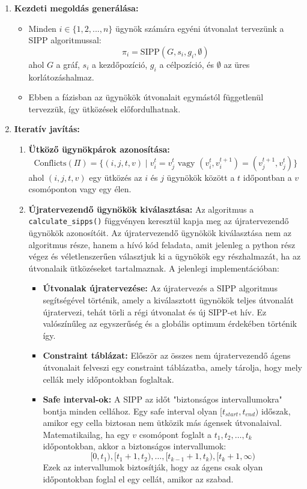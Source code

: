 \documentclass[a4paper,12pt]{article}
\begin{document}
\begin{enumerate}
    \item \textbf{Kezdeti megoldás generálása:}
    \begin{itemize}
        \item Minden $i \in \{1, 2, ..., n\}$ ügynök számára egyéni útvonalat tervezünk a SIPP algoritmussal:
        \[
        \pi_i = \text{SIPP}(G, s_i, g_i, \emptyset)
        \]
        ahol $G$ a gráf, $s_i$ a kezdőpozíció, $g_i$ a célpozíció, és $\emptyset$ az üres korlátozáshalmaz.
        \item Ebben a fázisban az ügynökök útvonalait egymástól függetlenül tervezzük, így ütközések előfordulhatnak.
    \end{itemize}

    \item \textbf{Iteratív javítás:}
    \begin{enumerate}
        \item \textbf{Ütköző ügynökpárok azonosítása:}
        \[
        \text{Conflicts}(\Pi) = \{(i, j, t, v) \mid v_i^t = v_j^t \text{ vagy } (v_i^t, v_i^{t+1}) = (v_j^{t+1}, v_j^t)\}
        \]
        ahol $(i, j, t, v)$ egy ütközés az $i$ és $j$ ügynökök között a $t$ időpontban a $v$ csomóponton vagy egy élen.

        \item \textbf{Újratervezendő ügynökök kiválasztása:}
        Az algoritmus a \texttt{calculate\_sipps()} függvényen keresztül kapja meg az újratervezendő ügynökök azonosítóit. Az újratervezendő ügynökök kiválasztása nem az algoritmus része, hanem a hívó kód feladata, amit jelenleg a python rész végez és véletlenszerűen választjuk ki a ügynökök egy részhalmazát, ha az útvonalaik ütközéseket tartalmaznak. A jelenlegi implementációban:
        \begin{itemize}
            \item \textbf{Útvonalak újratervezése:} Az újratervezés a SIPP algoritmus segítségével történik, amely a kiválasztott ügynökök teljes útvonalát újratervezi, tehát törli a régi útvonalat és új SIPP-et hív. Ez valószínűleg az egyszerűség és a globális optimum érdekében történik így.

            \item \textbf{Constraint táblázat:} Először az összes nem újratervezendő ágens útvonalait felveszi egy constraint táblázatba, amely tárolja, hogy mely cellák mely időpontokban foglaltak.

            \item \textbf{Safe interval-ok:} A SIPP az időt "biztonságos intervallumokra" bontja minden cellához. Egy safe interval olyan $[t_{start}, t_{end})$ időszak, amikor egy cella biztosan nem ütközik más ágensek útvonalaival. Matematikailag, ha egy $v$ csomópont foglalt a $t_1, t_2, \ldots, t_k$ időpontokban, akkor a biztonságos intervallumok:
            \[
            [0, t_1), [t_1+1, t_2), \ldots, [t_{k-1}+1, t_k), [t_k+1, \infty)
            \]
            Ezek az intervallumok biztosítják, hogy az ágens csak olyan időpontokban foglal el egy cellát, amikor az szabad.


\end{itemize}
\end{enumerate}
\end{enumerate}
\end{document}
